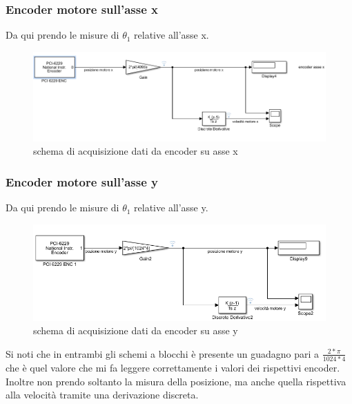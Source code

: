 \documentclass{article}
\begin{document}
\subsubsection{Encoder motore sull'asse x}
Da qui prendo le misure di $\theta_{1}$ relative all'asse x.

\begin{figure}[H]
\centering
\includegraphics[width=.8\textwidth]{./simulink_real/encoderx.png}
\caption{schema di acquisizione dati da encoder su asse x}
\end{figure}

\subsubsection{Encoder motore sull'asse y}
Da qui prendo le misure di $\theta_{1}$ relative all'asse y.

\begin{figure}[H]
\centering
\includegraphics[width=.8\textwidth]{./simulink_real/encodery.png}
\caption{schema di acquisizione dati da encoder su asse y}
\end{figure}
Si noti che in entrambi gli schemi a blocchi è presente un guadagno pari a $\frac{2*\pi}{1024*4}$ che è quel valore che mi fa leggere correttamente i valori dei rispettivi encoder.
Inoltre non prendo soltanto la misura della posizione, ma anche quella rispettiva alla velocità tramite una derivazione discreta.
\end{document}
